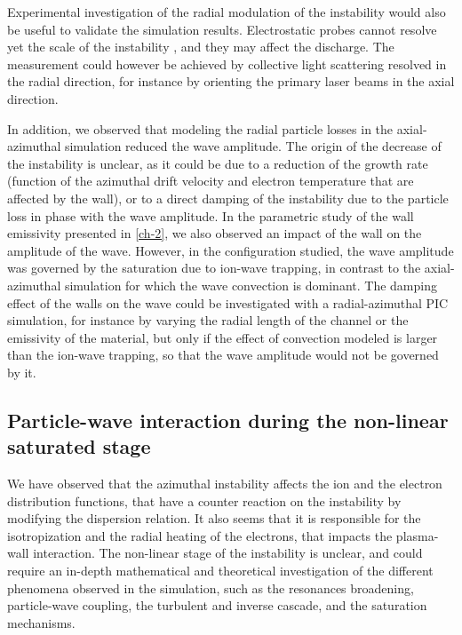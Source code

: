     Experimental investigation of the radial modulation of the instability would also be useful to validate the simulation results.
    Electrostatic probes cannot resolve yet the scale of the instability \citep{brown2018}, and they may affect the discharge.
    The measurement could however be achieved by collective light scattering \citep{tsikata2009} resolved in the radial direction, for instance by orienting the primary laser beams in the axial direction.

    In addition, we observed that modeling the radial particle losses in the axial-azimuthal simulation reduced the wave amplitude.
    The origin of the decrease of the instability is unclear, as it could be due to a reduction of the growth rate (function of the azimuthal drift velocity and electron temperature that are affected by the wall), or to a direct damping of the instability due to the particle loss in phase with the wave amplitude.
    In the parametric study of the wall emissivity presented in \cref{ch-2}, we also observed an impact of the wall on the amplitude of the wave.
    However, in the configuration studied, the  wave amplitude was governed by the saturation due to ion-wave trapping, in contrast to the axial-azimuthal simulation for which the wave convection is dominant.
    The damping effect of the walls on the wave could be investigated with a radial-azimuthal PIC simulation, for instance by varying the radial length of the channel or the emissivity of the material, but only if the effect of convection modeled is larger than the ion-wave trapping, so that the wave amplitude would not be governed by it.

  \subsection{Particle-wave interaction during the non-linear saturated stage}
    We have observed that the azimuthal instability affects the ion and the electron distribution functions, that have a counter reaction on the instability by modifying the dispersion relation.
    It also seems that it is responsible for the isotropization  and the radial heating of the electrons, that impacts the plasma-wall interaction.
    The non-linear stage of the instability is unclear, and could require an in-depth mathematical and theoretical investigation of the different phenomena observed in the simulation, such as the resonances broadening, particle-wave coupling, the turbulent and inverse cascade, and the saturation mechanisms.


